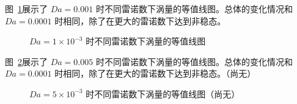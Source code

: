 图~\ref{fig: vorticity-contour-1e-3}展示了 $Da=0.001$ 时不同雷诺数下涡量的等值线图。总体的变化情况和 $Da=0.0001$ 时相同，除了在更大的雷诺数下达到非稳态。

\begin{figure}
	\centering
	\begin{minipage}{\textwidth}
		\centering
	\end{minipage}
	\centering
	\begin{minipage}{\textwidth}
		\centering
	\end{minipage}
	\centering
	\begin{minipage}{\textwidth}
		\centering
	\end{minipage}
	\caption{$Da=1\times 10^{-3}$ 时不同雷诺数下涡量的等值线图}
	\label{fig: vorticity-contour-1e-3}
\end{figure}

图~\ref{fig: vorticity-contour-5e-3}展示了 $Da=0.005$ 时不同雷诺数下涡量的等值线图。总体的变化情况和 $Da=0.0001$ 时相同，除了在更大的雷诺数下达到非稳态。（尚无）

\begin{figure}
	\centering
	\begin{minipage}{\textwidth}
		\centering
	\end{minipage}
	\centering
	\begin{minipage}{\textwidth}
		\centering
	\end{minipage}
	\centering
	\begin{minipage}{\textwidth}
		\centering
	\end{minipage}
	\caption{$Da=5\times 10^{-3}$ 时不同雷诺数下涡量的等值线图（尚无）}
	\label{fig: vorticity-contour-5e-3}
\end{figure}

